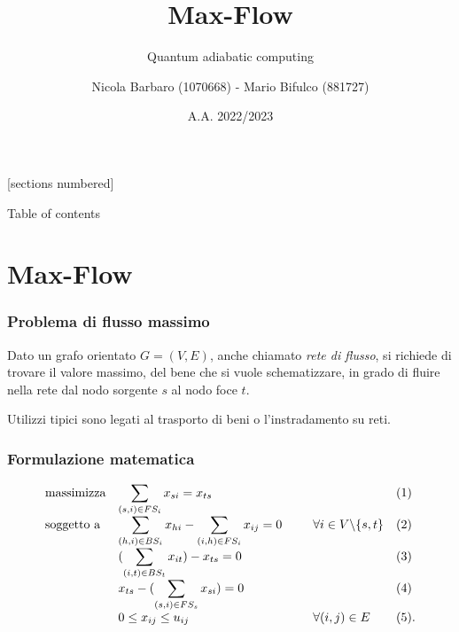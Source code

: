 \documentclass[10pt]{beamer}
\title{Max-Flow}
\subtitle{Quantum adiabatic computing}
\date{A.A. 2022/2023}
\author{Nicola Barbaro (1070668) - Mario Bifulco (881727)}
\institute{Università degli studi di Torino - Ottimizzazione Combinatoria}
\begin{document}
\maketitle

[sections numbered]

\begin{frame}{Table of contents}
  \tableofcontents
\end{frame}

\section{Max-Flow}
\begin{frame}
  \frametitle{Problema di flusso massimo}

  Dato un grafo orientato $G = (V, E)$, anche chiamato \emph{rete di flusso}, 
  si richiede di trovare il valore massimo, del bene che si vuole schematizzare, 
  in grado di fluire nella rete dal nodo sorgente $s$ al nodo foce $t$. 

  Utilizzi tipici sono legati al trasporto di beni o l'instradamento su reti.

\end{frame}
\begin{frame}
  \frametitle{Formulazione matematica}

  \begin{equation*}
    \begin{array}{ll@{}ll}
      \text{massimizza}   & \displaystyle\sum_{(s, i) \in FS_{i}} x_{si} = x_{ts} & \;\;\;\;\;\;\;\;\; &(1)\\
      \text{soggetto a}   & \displaystyle\sum_{(h, i) \in BS_{i}} x_{hi} - \sum_{(i, h) \in FS_{i}} x_{ij} = 0 \;\;\;\;\;\;\;\;\; &    \forall i \in V \backslash \{s,t\}&(2)\\
                          & (\displaystyle\sum_{(i, t) \in BS_{t}} x_{it}) - x_{ts} = 0 & &(3)\\
                          &  x_{ts} - (\displaystyle\sum_{(s,i) \in FS_{s}} x_{si}) = 0 & &(4)\\
                          &0 \leq x_{ij} \leq u_{ij} & \forall (i,j) \in E &(5).
    \end{array}
  \end{equation*}

\end{frame}
\end{document}
